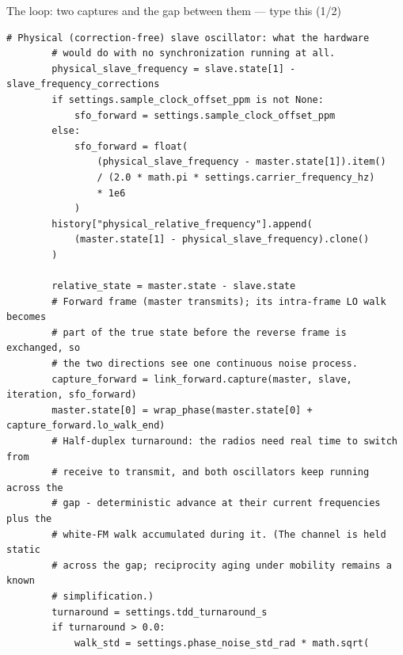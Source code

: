 \documentclass[10pt]{beamer}
\begin{document}
\begin{frame}[fragile]{The loop: two captures and the gap between them --- type this (1/2)}
\begin{lstlisting}[basicstyle=\ttfamily\tiny]
        # Physical (correction-free) slave oscillator: what the hardware
        # would do with no synchronization running at all.
        physical_slave_frequency = slave.state[1] - slave_frequency_corrections
        if settings.sample_clock_offset_ppm is not None:
            sfo_forward = settings.sample_clock_offset_ppm
        else:
            sfo_forward = float(
                (physical_slave_frequency - master.state[1]).item()
                / (2.0 * math.pi * settings.carrier_frequency_hz)
                * 1e6
            )
        history["physical_relative_frequency"].append(
            (master.state[1] - physical_slave_frequency).clone()
        )

        relative_state = master.state - slave.state
        # Forward frame (master transmits); its intra-frame LO walk becomes
        # part of the true state before the reverse frame is exchanged, so
        # the two directions see one continuous noise process.
        capture_forward = link_forward.capture(master, slave, iteration, sfo_forward)
        master.state[0] = wrap_phase(master.state[0] + capture_forward.lo_walk_end)
        # Half-duplex turnaround: the radios need real time to switch from
        # receive to transmit, and both oscillators keep running across the
        # gap - deterministic advance at their current frequencies plus the
        # white-FM walk accumulated during it. (The channel is held static
        # across the gap; reciprocity aging under mobility remains a known
        # simplification.)
        turnaround = settings.tdd_turnaround_s
        if turnaround > 0.0:
            walk_std = settings.phase_noise_std_rad * math.sqrt(
\end{lstlisting}
\end{frame}
\end{document}
